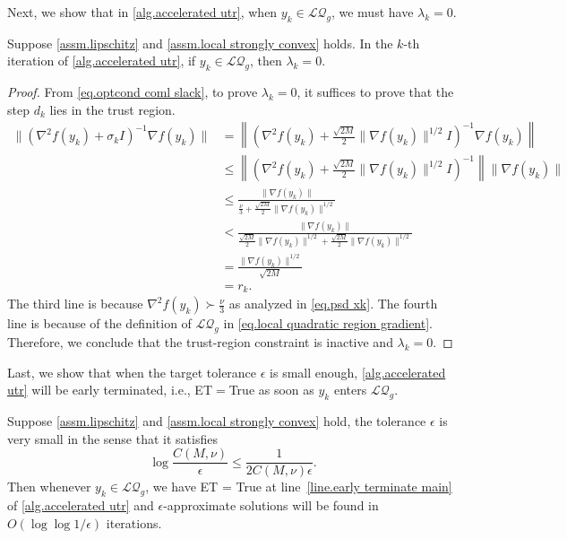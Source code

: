\documentclass{article}
\begin{document}
Next, we show that in \autoref{alg.accelerated utr}, when $y_k\in\mathcal{LQ}_g$, we must have $\lambda_k=0$.
\begin{lemma}
    \label{lem.detection of local quadratic}
    Suppose \autoref{assm.lipschitz} and \autoref{assm.local strongly convex} holds. In the $k$-th iteration of \autoref{alg.accelerated utr}, if $y_k\in\mathcal{LQ}_g$, then $\lambda_k=0$.
\end{lemma}
\begin{proof}
    From \eqref{eq.optcond coml slack}, to prove $\lambda_k=0$, it suffices to prove that the step $d_k$ lies in the trust region.
    \begin{equation*}
        \begin{aligned}
            \|(\nabla^2 f(y_k)+\sigma_k I)^{-1}\nabla f(y_k)\|&= \left\|\left (\nabla^2 f(y_k)+\frac{\sqrt{2M}}{2} \|\nabla f(y_k)\|^{1/2} I\right)^{-1}\nabla f(y_k)\right\|\\
            &\leq \left\|\left (\nabla^2 f(y_k)+\frac{\sqrt{2M}}{2} \|\nabla f(y_k)\|^{1/2} I\right)^{-1}\right\| \|\nabla f(y_k)\|\\
            &\leq \frac{\|\nabla f(y_k)\|}{\frac{\nu}{3}+\frac{\sqrt{2M}}{2} \|\nabla f(y_k)\|^{1/2}}\\
            &<\frac{\|\nabla f(y_k)\|}{\frac{\sqrt{2M}}{2}\|\nabla f(y_k)\|^{1/2}+\frac{\sqrt{2M}}{2} \|\nabla f(y_k)\|^{1/2}}\\
            &=\frac{\|\nabla f(y_k)\|^{1/2}}{\sqrt{2M}}\\
            &=r_k.
        \end{aligned}
    \end{equation*}
    The third line is because $\nabla^2 f(y_k)\succ \frac{\nu}{3}$ as analyzed in \eqref{eq.psd xk}. The fourth line is because of the definition of $\mathcal{LQ}_g$ in \eqref{eq.local quadratic region gradient}. Therefore, we conclude that the trust-region constraint is inactive and $\lambda_k=0$.
\end{proof}
Last, we show that when the target tolerance $\epsilon$ is small enough, \autoref{alg.accelerated utr} will be early terminated, i.e., ET$=$True as soon as $y_k$ enters $\mathcal{LQ}_g$.
\begin{theorem}
    \label{thm.local quadratic convergence}
    Suppose \autoref{assm.lipschitz} and \autoref{assm.local strongly convex} hold, the tolerance $\epsilon$ is very small in the sense that it satisfies
    \begin{equation}
        \label{eq.regularity epsilon}
        \log\frac{C(M,\nu)}{\epsilon}\leq \frac{1}{2C(M,\nu)\epsilon}.
    \end{equation}
    Then whenever $y_k\in\mathcal{LQ}_g$, we have ET = True at line~\ref{line.early terminate main} of \autoref{alg.accelerated utr} and $\epsilon$-approximate solutions will be found in $O(\log\log1/\epsilon)$ iterations. 
\end{theorem}
\end{document}
